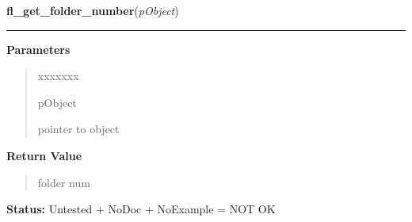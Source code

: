 \hspace{.8\funcindent}\begin{boxedminipage}{\funcwidth}

    \raggedright \textbf{fl\_get\_folder\_number}(\textit{pObject})

    \vspace{-1.5ex}

    \rule{\textwidth}{0.5\fboxrule}
\setlength{\parskip}{2ex}
\setlength{\parskip}{1ex}
      \textbf{Parameters}
      \vspace{-1ex}

      \begin{quote}
        \begin{Ventry}{xxxxxxx}

          \item[pObject]

          pointer to object

        \end{Ventry}

      \end{quote}

      \textbf{Return Value}
    \vspace{-1ex}

      \begin{quote}
      folder num

      \end{quote}

\textbf{Status:} Untested + NoDoc + NoExample = NOT OK



    \end{boxedminipage}

    \label{xformslib:library:fl_get_folder_name}

    \vspace{0.5ex}

